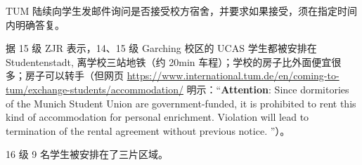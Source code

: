 
TUM 陆续向学生发邮件询问是否接受校方宿舍，并要求如果接受，须在指定时间内明确答复。

据 15 级 ZJR 表示，14、15 级 Garching 校区的 UCAS 学生都被安排在 Studentenstadt, 离学校三站地铁（约 20min 车程）；学校的房子比外面便宜很多；房子可以转手（但网页 \url{https://www.international.tum.de/en/coming-to-tum/exchange-students/accommodation/} 明示：``\textbf{Attention}: Since dormitories of the Munich Student Union are government-funded, it is prohibited to rent this kind of accommodation for personal enrichment. Violation will lead to termination of the rental agreement without previous notice. ''）。

16 级 9 名学生被安排在了三片区域。